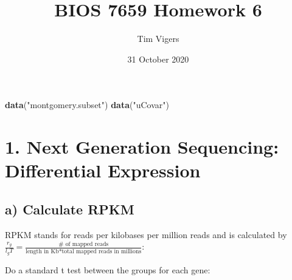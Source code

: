 \documentclass[
]{article}
\title{BIOS 7659 Homework 6}
\author{Tim Vigers}
\date{31 October 2020}
\newenvironment{Shaded}{\begin{snugshade}}{\end{snugshade}}
\newcommand{\DecValTok}[1]{\textcolor[rgb]{0.00,0.00,0.81}{#1}}
\newcommand{\KeywordTok}[1]{\textcolor[rgb]{0.13,0.29,0.53}{\textbf{#1}}}
\newcommand{\NormalTok}[1]{#1}
\newcommand{\OperatorTok}[1]{\textcolor[rgb]{0.81,0.36,0.00}{\textbf{#1}}}
\newcommand{\StringTok}[1]{\textcolor[rgb]{0.31,0.60,0.02}{#1}}
\begin{document}
\maketitle

\begin{Shaded}
\begin{Highlighting}[]
\KeywordTok{data}\NormalTok{(}\StringTok{"montgomery.subset"}\NormalTok{)}
\KeywordTok{data}\NormalTok{(}\StringTok{"uCovar"}\NormalTok{)}
\end{Highlighting}
\end{Shaded}

\hypertarget{next-generation-sequencing-differential-expression}{%
\section{1. Next Generation Sequencing: Differential
Expression}\label{next-generation-sequencing-differential-expression}}

\hypertarget{a-calculate-rpkm}{%
\subsection{a) Calculate RPKM}\label{a-calculate-rpkm}}

RPKM stands for reads per kilobases per million reads and is calculated
by
\(\frac{r_g}{l_g T}=\frac{\text{# of mapped reads}}{\text{length in Kb}*\text{total mapped reads in millions}}\):

\begin{Shaded}
\end{Shaded}

Do a standard t test between the groups for each gene:
\end{document}
